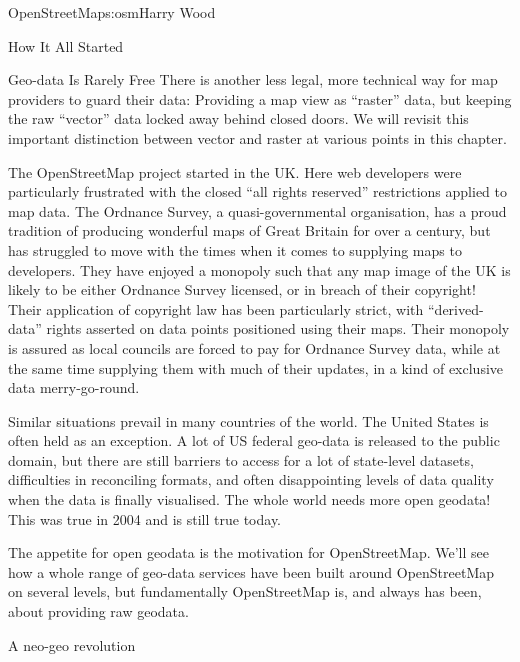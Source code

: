 \begin{aosachapter}{OpenStreetMap}{s:osm}{Harry Wood}
\begin{aosasect1}{How It All Started}
\begin{aosasect2}{Geo-data Is Rarely Free}
There is another less legal, more technical way for map providers to
guard their data: Providing a map view as ``raster'' data, but keeping
the raw ``vector'' data locked away behind closed doors. We will
revisit this important distinction between vector and raster at
various points in this chapter.

The OpenStreetMap project started in the UK. Here web developers were
particularly frustrated with the closed ``all rights reserved''
restrictions applied to map data. The Ordnance Survey, a
quasi-governmental organisation, has a proud tradition of producing
wonderful maps of Great Britain for over a century, but has struggled
to move with the times when it comes to supplying maps to
developers. They have enjoyed a monopoly such that any map image of
the UK is likely to be either Ordnance Survey licensed, or in breach
of their copyright! Their application of copyright law has been
particularly strict, with ``derived-data'' rights asserted on data
points positioned using their maps. Their monopoly is assured as local
councils are forced to pay for Ordnance Survey data, while at the same
time supplying them with much of their updates, in a kind of exclusive
data merry-go-round.

Similar situations prevail in many countries of the world. The United
States is often held as an exception. A lot of US federal geo-data is
released to the public domain, but there are still barriers to access
for a lot of state-level datasets, difficulties in reconciling
formats, and often disappointing levels of data quality when the data
is finally visualised. The whole world needs more open geodata! This
was true in 2004 and is still true today.

The appetite for open geodata is the motivation for
OpenStreetMap. We'll see how a whole range of geo-data services have
been built around OpenStreetMap on several levels, but fundamentally
OpenStreetMap is, and always has been, about providing raw geodata.

\end{aosasect2}

\begin{aosasect2}{A neo-geo revolution}


\end{aosasect2}
\end{aosasect1}
\end{aosachapter}
